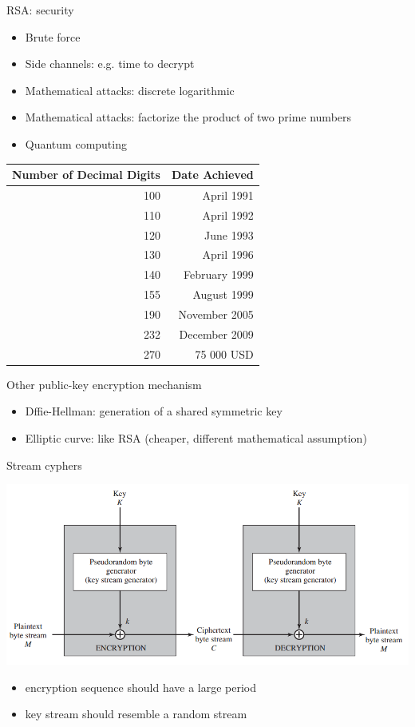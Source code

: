 \documentclass{beamer}
\begin{document}
\begin{frame}{RSA: security}
  \begin{itemize}
    \item Brute force 
    \item Side channels: e.g. time to decrypt
    \item Mathematical attacks: discrete logarithmic
    \item Mathematical attacks: factorize the product of two prime numbers
    \item Quantum computing
  \end{itemize}
  \begin{center}
    \begin{tabular}{|r|r|}
      \hline
  Number of Decimal Digits &
  Date Achieved \\
  \hline
 100 & April 1991 \\ 
 110 & April 1992\\
 120 & June 1993 \\
 130 & April 1996\\
 140 & February 1999\\
 155 & August 1999 \\
 190 & November 2005 \\
 232 & December 2009 \\
 270 & 75 000 USD \\
 \hline
 \end{tabular}
  \end{center}
\end{frame}


\begin{frame}{Other public-key encryption mechanism}
  \begin{itemize}
    \item Dffie-Hellman: generation of a shared symmetric key 
    \item Elliptic curve: like RSA (cheaper, different mathematical assumption)
  \end{itemize}
\end{frame}

\begin{frame}{Stream cyphers}
  \begin{center}
    \includegraphics[width=0.8\linewidth]{stream}
  \end{center}
  \begin{itemize}
    \item  encryption sequence should have a large period 
    \item  key stream should resemble a random stream
  \end{itemize}
\end{frame}
\end{document}
